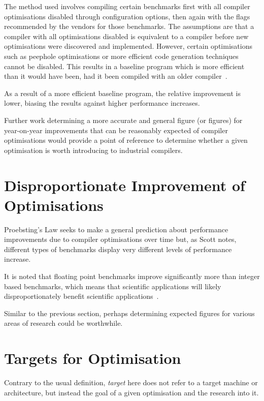 The method used involves compiling certain benchmarks first with all compiler optimisations disabled through configuration options, then again with the flags recommended by the vendors for those benchmarks. The assumptions are that a compiler with all optimisations disabled is equivalent to a compiler before new optimisations were discovered and implemented. However, certain optimisations such as peephole optimisations or more efficient code generation techniques cannot be disabled. This results in a baseline program which is more efficient than it would have been, had it been compiled with an older compiler~\cite{proebstingformal}.

As a result of a more efficient baseline program, the relative improvement is lower, biasing the results against higher performance increases.

Further work determining a more accurate and general figure (or figures) for year-on-year improvements that can be reasonably expected of compiler optimisations would provide a point of reference to determine whether a given optimisation is worth introducing to industrial compilers.

\section{Disproportionate Improvement of Optimisations}

Proebsting's Law seeks to make a general prediction about performance improvements due to compiler optimisations over time but, as Scott notes, different types of benchmarks display very different levels of performance increase.

It is noted that floating point benchmarks improve significantly more than integer based benchmarks, which means that scientific applications will likely disproportionately benefit scientific applications~\cite{proebstingformal}.

Similar to the previous section, perhaps determining expected figures for various areas of research could be worthwhile.

\section{Targets for Optimisation}

Contrary to the usual definition, \textit{target} here does not refer to a target machine or architecture, but instead the goal of a given optimisation and the research into it.

